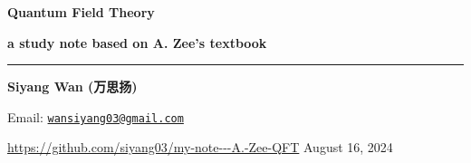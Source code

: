 \begin{titlepage}
	\vspace*{100pt}
	
	{\Huge \textbf{Quantum Field Theory}}
	
	\vspace{10pt}
	
	{\LARGE \textbf{a study note based on A. Zee's textbook}}
	
	\vspace{20pt}
	
	\noindent\rule[0.5ex]{\linewidth}{1.5pt} %
	
	\vspace{20pt}
	
	{\large \textbf{Siyang Wan (万思扬)}}
	
	\vfill
	
	Email: \href{mailto:wansiyang03@gmail.com}{\texttt{wansiyang03@gmail.com}}
	
	\url{https://github.com/siyang03/my-note---A.-Zee-QFT} \hfill August 16, 2024
\end{titlepage}
